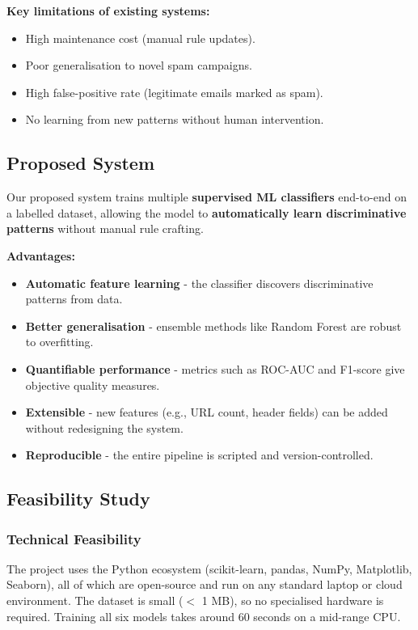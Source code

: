 \documentclass[12pt, a4paper]{article}
\begin{document}
\textbf{Key limitations of existing systems:}
\begin{itemize}
    \item High maintenance cost (manual rule updates).
    \item Poor generalisation to novel spam campaigns.
    \item High false-positive rate (legitimate emails marked as spam).
    \item No learning from new patterns without human intervention.
\end{itemize}

\subsection{Proposed System}
Our proposed system trains multiple \textbf{supervised ML classifiers} end-to-end on a labelled dataset, allowing the model to \textbf{automatically learn discriminative patterns} without manual rule crafting.

\vspace{1em}

\textbf{Advantages:}
\begin{itemize}
    \item \textbf{Automatic feature learning} - the classifier discovers discriminative patterns from data.
    \item \textbf{Better generalisation} - ensemble methods like Random Forest are robust to overfitting.
    \item \textbf{Quantifiable performance} - metrics such as ROC-AUC and F1-score give objective quality measures.
    \item \textbf{Extensible} - new features (e.g., URL count, header fields) can be added without redesigning the system.
    \item \textbf{Reproducible} - the entire pipeline is scripted and version-controlled.
\end{itemize}

\subsection{Feasibility Study}

\subsubsection*{Technical Feasibility}
The project uses the Python ecosystem (scikit-learn, pandas, NumPy, Matplotlib, Seaborn), all of which are open-source and run on any standard laptop or cloud environment. The dataset is small ($<$ 1 MB), so no specialised hardware is required. Training all six models takes around 60 seconds on a mid-range CPU.
\end{document}

